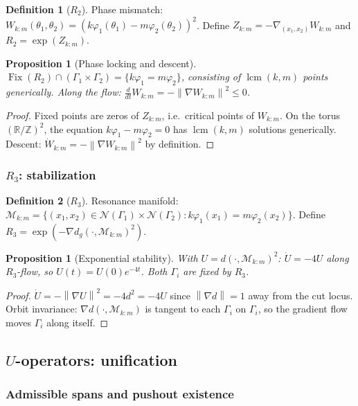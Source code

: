 \documentclass[12pt, oneside]{book}
\theoremstyle{plain}
\newtheorem{proposition}[theorem]{Proposition}
\theoremstyle{definition}
\newtheorem{definition}{Definition}[section]
\theoremstyle{remark}
\newcommand{\R}{\mathbb{R}}
\newcommand{\Orb}{\Gamma}
\newcommand{\cN}{\mathcal{N}}
\newcommand{\cM}{\mathcal{M}}
\newcommand{\dg}{d_g}
\newcommand{\norm}[1]{\left\|#1\right\|}
\DeclareMathOperator{\lcm}{lcm}
\DeclareMathOperator{\Fix}{Fix}
\begin{document}
\begin{definition}[$R_2$]\label{def:R2}
Phase mismatch:
$W_{k:m}(\theta_1,\theta_2)=(k\varphi_1(\theta_1)-m\varphi_2(\theta_2))^2$.
Define $Z_{k:m}=-\nabla_{(x_1,x_2)}W_{k:m}$ and
$R_2=\exp(Z_{k:m})$.
\end{definition}

\begin{proposition}[Phase locking and descent]\label{prop:R2}
$\Fix(R_2)\cap(\Orb_1\times\Orb_2)=\{k\varphi_1=m\varphi_2\}$,
consisting of $\lcm(k,m)$ points generically.
Along the flow: $\tfrac{d}{dt}W_{k:m}=-\norm{\nabla W_{k:m}}^2\le 0$.
\end{proposition}
\begin{proof}
Fixed points are zeros of $Z_{k:m}$, i.e.\ critical points of
$W_{k:m}$. On the torus $(\R/\mathbb{Z})^2$, the equation
$k\varphi_1-m\varphi_2=0$ has $\lcm(k,m)$ solutions generically.
Descent: $\dot W_{k:m}=-\norm{\nabla W_{k:m}}^2$ by definition.
\end{proof}

\subsubsection{\texorpdfstring{$R_3$}{R3}: stabilization}

\begin{definition}[$R_3$]\label{def:R3}
Resonance manifold:
$\cM_{k:m}=\{(x_1,x_2)\in\cN(\Orb_1)\times\cN(\Orb_2):
k\varphi_1(x_1)=m\varphi_2(x_2)\}$.
Define $R_3=\exp(-\nabla\dg(\cdot,\cM_{k:m})^2)$.
\end{definition}

\begin{proposition}[Exponential stability]\label{prop:R3}
With $U=d(\cdot,\cM_{k:m})^2$: $\dot U=-4U$ along $R_3$-flow,
so $U(t)=U(0)e^{-4t}$.
Both $\Orb_i$ are fixed by $R_3$.
\end{proposition}
\begin{proof}
$\dot U=-\norm{\nabla U}^2=-4d^2=-4U$ since $\norm{\nabla d}=1$
away from the cut locus. Orbit invariance: $\nabla d(\cdot,\cM_{k:m})$
is tangent to each $\Orb_i$ on $\Orb_i$, so the gradient flow moves
$\Orb_i$ along itself.
\end{proof}

\subsection{\texorpdfstring{$U$}{U}-operators: unification}
\label{subsec:U}

\subsubsection{Admissible spans and pushout existence}
\end{document}

